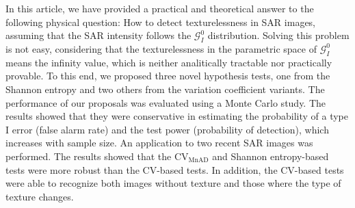\documentclass[remotesensing,article,submit,moreauthors,pdftex]{Definitions/mdpi}
\begin{document}
In this article, we have provided a practical and theoretical answer to the following physical question: How to detect texturelessness in SAR images, assuming that the SAR intensity follows the $\mathcal{G}^0_I$ distribution.
Solving this problem is not easy, considering that the texturelessness in the parametric space of $\mathcal{G}^0_I$ means the infinity value, which is neither analitically tractable nor practically provable.
To this end, we proposed three novel hypothesis tests, one from the Shannon entropy and two others from the variation coefficient variants.
The performance of our proposals was evaluated using a Monte Carlo study. The results showed that they were conservative in estimating the probability of a type I error (false alarm rate) and the test power (probability of detection), which increases with sample size.
An application to two recent SAR images was performed. The results showed that the $\text{CV}_{\text{MnAD}}$ and Shannon entropy-based tests were more robust than the CV-based tests. In addition, the CV-based tests were able to recognize both images without texture and those where the type of texture changes.



\vspace{6pt}



\end{document}
